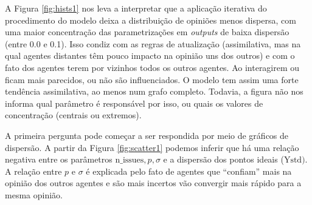 %
%

    A Figura \ref{fig:hists1} nos leva a interpretar que a aplicação iterativa
    do procedimento do modelo deixa a distribuição de opiniões menos dispersa,
    com uma maior concentração das parametrizações em \textit{outputs} de baixa
    dispersão (entre 0.0 e 0.1). Isso condiz com as regras de atualização
    (assimilativa, mas na qual agentes distantes têm pouco impacto na opinião
    uns dos outros) e com o fato dos agentes terem por vizinhos todos os outros
    agentes. Ao interagirem ou ficam mais parecidos, ou não são influenciados. O
    modelo tem assim uma forte tendência assimilativa, ao menos num grafo
    completo. Todavia, a figura não nos informa qual parâmetro é responsável por
    isso, ou quais os valores de concentração (centrais ou extremos).

    A primeira pergunta pode começar a ser respondida por meio de gráficos de
    dispersão. A partir da Figura \ref{fig:scatter1} podemos inferir que há uma
    relação negativa entre os parâmetros \(\text{n\_issues}, p, \sigma \) e a
    dispersão dos pontos ideais (\( \text{Ystd}) \). A relação entre \(p\) e
    \(\sigma\) é explicada pelo fato de agentes que ``confiam'' mais na opinião
    dos outros agentes e são mais incertos vão convergir mais rápido para a
    mesma opinião.

